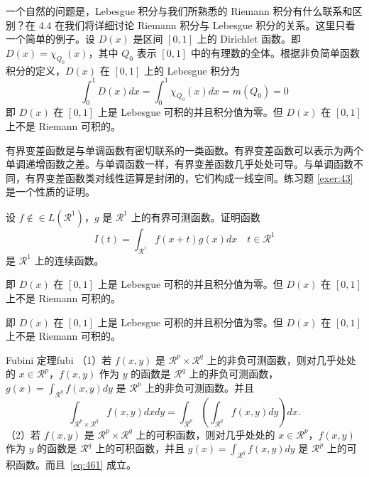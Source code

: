 \documentclass[cn,11pt]{elegantbook}
\begin{document}
一个自然的问题是，Lebesgue 积分与我们所熟悉的 Riemann 积分有什么联系和区别？在 4.4 在我们将详细讨论 Riemann 积分与 Lebesgue 积分的关系。这里只看一个简单的例子。设 $D(x)$ 是区间 $[0,1]$ 上的 Dirichlet 函数。即 $D(x)=\chi_{Q_0}(x)$，其中 $Q_0$ 表示 $[0,1]$ 中的有理数的全体。根据非负简单函数积分的定义，$D(x)$ 在 $[0,1]$ 上的 Lebesgue 积分为
\begin{equation}
   \label{inter2}
   \int_0^1 D(x)dx = \int_0^1 \chi_{Q_0} (x) dx = m(Q_0) = 0
\end{equation}
即 $D(x)$ 在 $[0,1]$ 上是 Lebesgue 可积的并且积分值为零。但 $D(x)$ 在 $[0,1]$ 上不是 Riemann 可积的。



有界变差函数是与单调函数有密切联系的一类函数。有界变差函数可以表示为两个单调递增函数之差。与单调函数一样，有界变差函数几乎处处可导。与单调函数不同，有界变差函数类对线性运算是封闭的，它们构成一线空间。练习题 \ref{exer:43} 是一个性质的证明。

\begin{exercise}\label{exer:43}
设 $f \notin\in L(\mathcal{R}^1)$，$g$ 是 $\mathcal{R}^1$ 上的有界可测函数。证明函数
\begin{equation}
   \label{ex:1}
   I(t) = \int_{\mathcal{R}^1} f(x+t)g(x)dx \quad t \in \mathcal{R}^1
\end{equation}
是 $\mathcal{R}^1$ 上的连续函数。
\end{exercise}

\begin{problem}
即 $D(x)$ 在 $[0,1]$ 上是 Lebesgue 可积的并且积分值为零。但 $D(x)$ 在 $[0,1]$ 上不是 Riemann 可积的。
\end{problem}

\begin{solution}
即 $D(x)$ 在 $[0,1]$ 上是 Lebesgue 可积的并且积分值为零。但 $D(x)$ 在 $[0,1]$ 上不是 Riemann 可积的。
\end{solution}

\begin{theorem}{Fubini 定理}{fubi} 
（1）若 $f(x,y)$ 是 $\mathcal{R}^p\times\mathcal{R}^q$ 上的非负可测函数，则对几乎处处的 $x\in \mathcal{R}^p$，$f(x,y)$ 作为 $y$ 的函数是 $\mathcal{R}^q$ 上的非负可测函数，$g(x)=\int_{\mathcal{R}^q}f(x,y) dy$ 是 $\mathcal{R}^p$ 上的非负可测函数。并且
\begin{equation}
   \label{eq:461}
   \int_{\mathcal{R}^p\times\mathcal{R}^q} f(x,y) dxdy=\int_{\mathcal{R}^p}\left(\int_{\mathcal{R}^q}f(x,y)dy\right)dx.
\end{equation}
（2）若 $f(x,y)$ 是 $\mathcal{R}^p\times\mathcal{R}^q$ 上的可积函数，则对几乎处处的 $x\in\mathcal{R}^p$，$f(x,y)$ 作为 $y$ 的函数是 $\mathcal{R}^q$ 上的可积函数，并且 $g(x)=\int_{\mathcal{R}^q}f(x,y) dy$ 是 $\mathcal{R}^p$ 上的可积函数。而且~\ref{eq:461} 成立。
\end{theorem}
\end{document}
